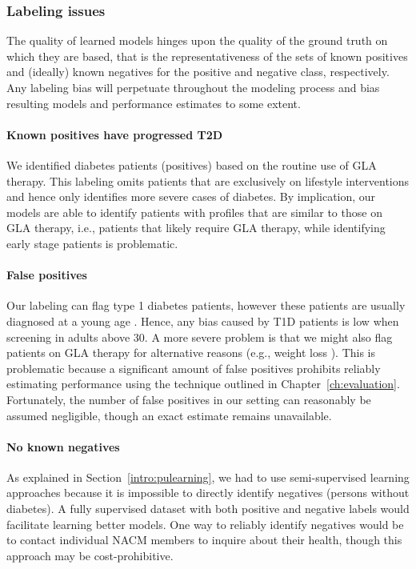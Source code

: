 \subsubsection{Labeling issues}
The quality of learned models hinges upon the quality of the ground truth on which they are based, that is the representativeness of the sets of known positives and (ideally) known negatives for the positive and negative class, respectively. Any labeling bias will perpetuate throughout the modeling process and bias resulting models and performance estimates to some extent.

\paragraph{Known positives have progressed T2D} We identified diabetes patients (positives) based on the routine use of GLA therapy. This labeling omits patients that are exclusively on lifestyle interventions and hence only identifies more severe cases of diabetes. By implication, our models are able to identify patients with profiles that are similar to those on GLA therapy, i.e., patients that likely require GLA therapy, while identifying early stage patients is problematic. 

\paragraph{False positives} Our labeling can flag type 1 diabetes patients, however these patients are usually diagnosed at a young age \citep{american2010diagnosis}. Hence, any bias caused by T1D patients is low when screening in adults above 30. A more severe problem is that we might also flag patients on GLA therapy for alternative reasons (e.g., weight loss \citep{morrison2014metformin}). This is problematic because a significant amount of false positives prohibits reliably estimating performance using the technique outlined in Chapter~\ref{ch:evaluation}. Fortunately, the number of false positives in our setting can reasonably be assumed negligible, though an exact estimate remains unavailable.

\paragraph{No known negatives} As explained in Section~\ref{intro:pulearning}, we had to use semi-supervised learning approaches because it is impossible to directly identify negatives (persons without diabetes). A fully supervised dataset with both positive and negative labels would facilitate learning better models. One way to reliably identify negatives would be to contact individual NACM members to inquire about their health, though this approach may be cost-prohibitive.

